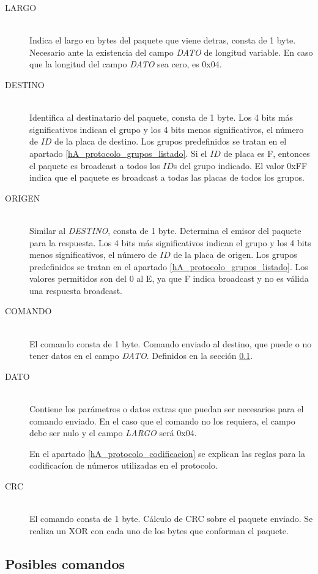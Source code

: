 \begin{description}
  \item[LARGO] \hfill \\
	Indica el largo en bytes del paquete que viene detras, consta de 1 byte.
	Necesario ante la existencia del campo \emph{DATO} de longitud variable.
	En caso que la longitud del campo \emph{DATO} sea cero, es 0x04.
  \item[DESTINO] \hfill \\
	Identifica al destinatario del paquete, consta de 1 byte.
	Los 4 bits m\'as significativos indican el grupo y los 4 bits menos significativos, el n\'umero de $ID$ de la placa de destino.
	Los grupos predefinidos se tratan en el apartado \ref{hA_protocolo_grupos_listado}.
	Si el $ID$ de placa es F, entonces el paquete es broadcast a todos los $ID$s del grupo indicado.
	El valor 0xFF indica que el paquete es broadcast a todas las placas de todos los grupos.
  \item[ORIGEN] \hfill \\
	Similar al \emph{DESTINO}, consta de 1 byte.
	Determina el emisor del paquete para la respuesta.
	Los 4 bits m\'as significativos indican el grupo y los 4 bits menos significativos, el n\'umero de $ID$ de la placa de origen.
	Los grupos predefinidos se tratan en el apartado \ref{hA_protocolo_grupos_listado}.
	Los valores permitidos son del 0 al E, ya que F indica broadcast y no es v\'alida una respuesta broadcast.
  \item[COMANDO] \hfill \\
	El comando consta de 1 byte.
	Comando enviado al destino, que puede o no tener datos en el campo \emph{DATO}.
	Definidos en la secci\'on \ref{hA_protocolo_comandos}.
  \item[DATO] \hfill \\
	Contiene los par\'ametros o datos extras que puedan ser necesarios para el comando enviado.
	En el caso que el comando no los requiera, el campo debe ser nulo y el campo \emph{LARGO} ser\'a 0x04.

	En el apartado \ref{hA_protocolo_codificacion} se explican las reglas para la codificac\'ion de n\'umeros utilizadas en el protocolo.
  \item[CRC] \hfill \\
	El comando consta de 1 byte.
	C\'alculo de CRC sobre el paquete enviado.
	Se realiza un XOR con cada uno de los bytes que conforman el paquete.
\end{description}

\subsection{Posibles comandos}
\label{hA_protocolo_comandos}

